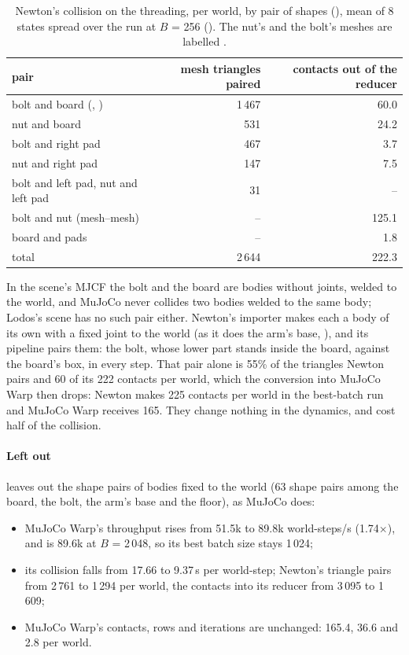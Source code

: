 \begin{table}[t]
\centering
\caption{Newton's collision on the threading, per world, by pair of shapes (), mean of 8 states spread over the run at $B$ = 256 (). The nut's and the bolt's meshes are labelled .}
\label{tab:census}
\small
\begin{tabularx}{\linewidth}{@{}Yrr@{}}
\toprule
pair & mesh triangles paired & contacts out of the reducer \\
\midrule
bolt and board (, ) & 1\,467 & 60.0 \\
nut and board & 531 & 24.2 \\
bolt and right pad & 467 & 3.7 \\
nut and right pad & 147 & 7.5 \\
bolt and left pad, nut and left pad & 31 & -- \\
bolt and nut (mesh--mesh) & -- & 125.1 \\
board and pads & -- & 1.8 \\
total & 2\,644 & 222.3 \\
\bottomrule
\end{tabularx}
\end{table}

In the scene's MJCF the bolt and the board are bodies without joints, welded to the world, and MuJoCo never collides two bodies welded to the same body; Lodos's scene has no such pair either. Newton's importer makes each a body of its own with a fixed joint to the world (as it does the arm's base, ), and its pipeline pairs them: the bolt, whose lower part stands inside the board, against the board's box, in every step. That pair alone is 55\% of the triangles Newton pairs and 60 of its 222 contacts per world, which the conversion into MuJoCo Warp then drops: Newton makes 225 contacts per world in the best-batch run and MuJoCo Warp receives 165. They change nothing in the dynamics, and cost half of the collision.

\paragraph{Left out}  leaves out the shape pairs of bodies fixed to the world (63 shape pairs among the board, the bolt, the arm's base  and the floor), as MuJoCo does:

\begin{itemize}
\item MuJoCo Warp's throughput rises from 51.5k to 89.8k world-steps/s (1.74$\times$), and is 89.6k at $B$ = 2\,048, so its best batch size stays 1\,024;
\item its collision falls from 17.66 to 9.37\,\micro s per world-step; Newton's triangle pairs from 2\,761 to 1\,294 per world, the contacts into its reducer from 3\,095 to 1\,609;
\item MuJoCo Warp's contacts, rows and iterations are unchanged: 165.4, 36.6 and 2.8 per world.
\end{itemize}

